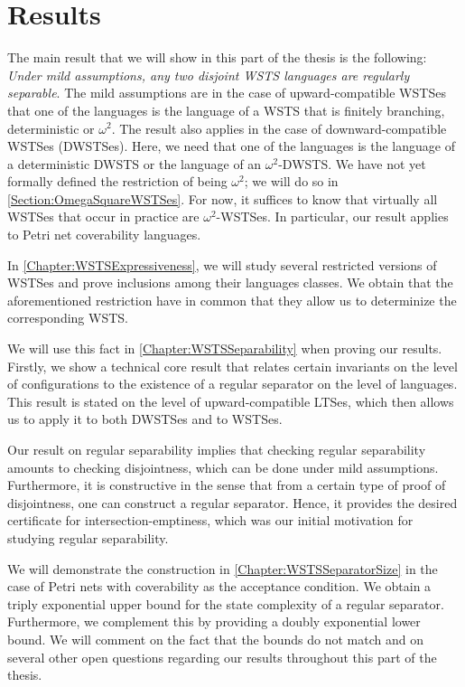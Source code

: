 \documentclass[../../diss.tex]{subfiles}
\begin{document}
\section{Results}%
\label{Separability:Results}

The main result that we will show in this part of the thesis is the following:
\emph{Under mild assumptions, any two disjoint WSTS languages are regularly separable}.
The mild assumptions are in the case of upward-compatible WSTSes that one of the languages is the language of a WSTS that is finitely branching, deterministic or $\omega^2$.
The result also applies in the case of downward-compatible WSTSes (DWSTSes).
Here, we need that one of the languages is the language of a deterministic DWSTS or the language of an $\omega^2$-DWSTS.\@
We have not yet formally defined the restriction of being $\omega^2$; we will do so in \cref{Section:OmegaSquareWSTSes}.
For now, it suffices to know that virtually all WSTSes that occur in practice are $\omega^2$-WSTSes.
In particular, our result applies to Petri net coverability languages.

In \cref{Chapter:WSTSExpressiveness}, we will study several restricted versions of WSTSes and prove inclusions among their languages classes.
We obtain that the aforementioned restriction have in common that they allow us to determinize the corresponding WSTS.\@

We will use this fact in \cref{Chapter:WSTSSeparability} when proving our results.
Firstly, we show a technical core result that relates certain invariants on the level of configurations to the existence of a regular separator on the level of languages.
This result is stated on the level of upward-compatible LTSes, which then allows us to apply it to both DWSTSes and to WSTSes.

Our result on regular separability implies that checking regular separability amounts to checking disjointness, which can be done under mild assumptions.
Furthermore, it is constructive in the sense that from a certain type of proof of disjointness, one can construct a regular separator.
Hence, it provides the desired certificate for intersection-emptiness, which was our initial motivation for studying regular separability.

We will demonstrate the construction in \cref{Chapter:WSTSSeparatorSize} in the case of Petri nets with coverability as the acceptance condition.
We obtain a triply exponential upper bound for the state complexity of a regular separator.
Furthermore, we complement this by providing a doubly exponential lower bound.
We will comment on the fact that the bounds do not match and on several other open questions regarding our results throughout this part of the thesis.
\end{document}
